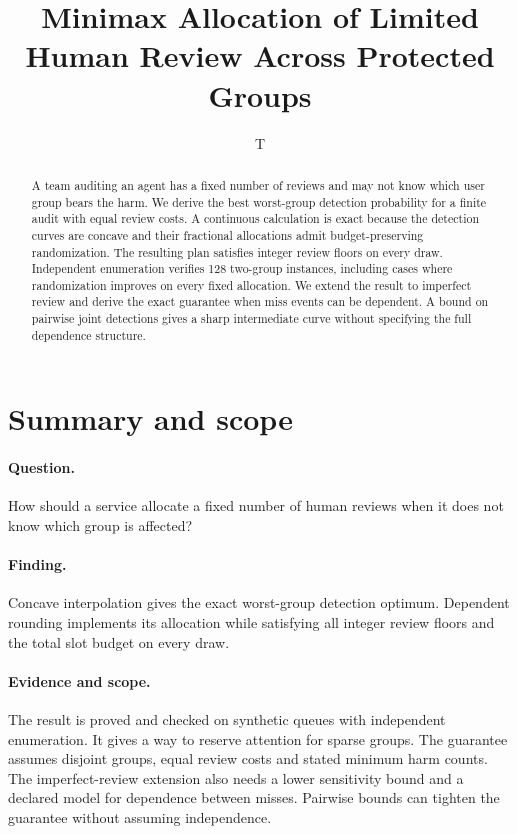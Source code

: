 \documentclass[11pt]{article}
\title{Minimax Allocation of Limited Human Review Across Protected Groups}
\author{T}
\date{}
\begin{document}
\maketitle
\begin{abstract}
A team auditing an agent has a fixed number of reviews and may not
know which user group bears the harm. We derive the best worst-group
detection probability for a finite audit with equal review costs.
A continuous calculation is exact because the detection curves are
concave and their fractional allocations admit budget-preserving
randomization. The resulting plan satisfies integer review floors
on every draw. Independent enumeration verifies 128 two-group
instances, including cases where randomization improves on every
fixed allocation. We extend the result to imperfect review and
derive the exact guarantee when miss events can be dependent.
A bound on pairwise joint detections gives a sharp intermediate
curve without specifying the full dependence structure.
\end{abstract}

\section*{Summary and scope}
\paragraph{Question.} How should a service allocate a fixed number of
human reviews when it does not know which group is affected?
\paragraph{Finding.} Concave interpolation gives the exact worst-group
detection optimum. Dependent rounding implements its allocation while
satisfying all integer review floors and the total slot budget on every
draw.
\paragraph{Evidence and scope.} The result is proved and checked
on synthetic queues with independent enumeration. It gives a way to
reserve attention for sparse groups. The guarantee assumes disjoint
groups, equal review costs and stated minimum harm counts.
The imperfect-review extension also needs a lower sensitivity bound
and a declared model for dependence between misses. Pairwise
bounds can tighten the guarantee without assuming independence.
\end{document}
